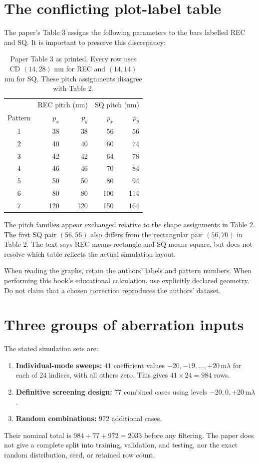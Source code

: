 \section{The conflicting plot-label table}
The paper's Table 3 assigns the following parameters to the bars labelled
REC and SQ. It is important to preserve this discrepancy:
\begin{table}[htbp]\centering\small
\caption{Paper Table 3 as printed. Every row uses CD $(14,28)$ nm for
REC and $(14,14)$ nm for SQ. These pitch assignments disagree with Table 2.}
\begin{tabular}{@{}crrrr@{}}
\toprule & \multicolumn{2}{c}{REC pitch (nm)}
& \multicolumn{2}{c}{SQ pitch (nm)}\\
Pattern & $p_x$ & $p_y$ & $p_x$ & $p_y$\\ \midrule
1&38&38&56&56\\
2&40&40&60&74\\
3&42&42&64&78\\
4&46&46&70&84\\
5&50&50&80&94\\
6&80&80&100&114\\
7&120&120&150&164\\
\bottomrule
\end{tabular}
\end{table}
The pitch families appear exchanged relative to the shape assignments
in Table 2. The first SQ pair $(56,56)$ also differs from the rectangular
pair $(56,70)$ in Table 2.
The text says REC means rectangle and SQ means square, but does not
resolve which table reflects the actual simulation layout.

When reading the graphs, retain the authors' labels and pattern numbers.
When performing this book's educational calculation, use explicitly
declared geometry. Do not claim that a chosen correction reproduces
the authors' dataset.

\section{Three groups of aberration inputs}
The stated simulation sets are:
\begin{enumerate}
\item \textbf{Individual-mode sweeps:} 41 coefficient values
$-20,-19,\ldots,+20\,\mathrm{m}\lambda$ for each of 24 indices,
with all others zero. This gives $41\times24=984$ rows.
\item \textbf{Definitive screening design:} 77 combined cases using
levels $-20,0,+20\,\mathrm{m}\lambda$.
\item \textbf{Random combinations:} 972 additional cases.
\end{enumerate}
Their nominal total is $984+77+972=2033$ before any filtering.
The paper does not give a complete split into training, validation,
and testing, nor the exact random distribution, seed, or retained row count.

